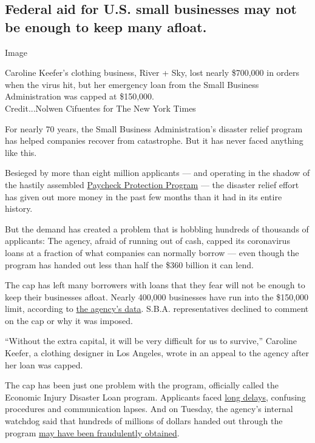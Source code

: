 \hypertarget{federal-aid-for-us-small-businesses-may-not-be-enough-to-keep-many-afloat}{%
\subsection{Federal aid for U.S. small businesses may not be enough to
keep many
afloat.}\label{federal-aid-for-us-small-businesses-may-not-be-enough-to-keep-many-afloat}}

Image

Caroline Keefer's clothing business, River + Sky, lost nearly \$700,000
in orders when the virus hit, but her emergency loan from the Small
Business Administration was capped at \$150,000.\\

Credit...Nolwen Cifuentes for The New York Times

For nearly 70 years, the Small Business Administration's disaster relief
program has helped companies recover from catastrophe. But it has never
faced anything like this.

Besieged by more than eight million applicants --- and operating in the
shadow of the hastily assembled
\href{https://www.nytimes3xbfgragh.onion/2020/04/26/business/ppp-small-business-loans.html}{Paycheck
Protection Program} --- the disaster relief effort has given out more
money in the past few months than it had in its entire history.

But the demand has created a problem that is hobbling hundreds of
thousands of applicants: The agency, afraid of running out of cash,
capped its coronavirus loans at a fraction of what companies can
normally borrow --- even though the program has handed out less than
half the \$360 billion it can lend.

The cap has left many borrowers with loans that they fear will not be
enough to keep their businesses afloat. Nearly 400,000 businesses have
run into the \$150,000 limit, according to
\href{https://www.sba.gov/funding-programs/loans/coronavirus-relief-options/economic-injury-disaster-loans\#section-header-5}{the
agency's data}. S.B.A. representatives declined to comment on the cap or
why it was imposed.

``Without the extra capital, it will be very difficult for us to
survive,'' Caroline Keefer, a clothing designer in Los Angeles, wrote in
an appeal to the agency after her loan was capped.

The cap has been just one problem with the program, officially called
the Economic Injury Disaster Loan program. Applicants faced
\href{https://www.nytimes3xbfgragh.onion/2020/04/09/business/smallbusiness/small-business-disaster-loans-coronavirus.html}{long
delays}, confusing procedures and communication lapses. And on Tuesday,
the agency's internal watchdog said that hundreds of millions of dollars
handed out through the program
\href{https://www.nytimes3xbfgragh.onion/live/2020/07/28/business/stock-market-today-coronavirus\#thieves-are-targeting-small-business-relief-programs-a-watchdog-says}{may
have been fraudulently obtained}.

